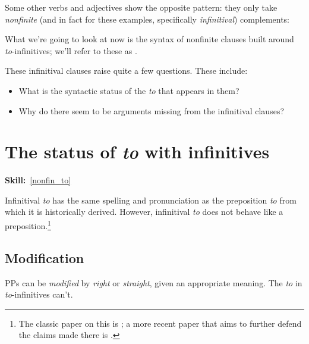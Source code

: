 \documentclass{article}
\begin{document}
Some other verbs and adjectives show the opposite pattern: they only take \textit{nonfinite} (and in fact for these examples, specifically \emph{infinitival}) complements:
\begin{exe}
\end{exe}

What we're going to look at now is the syntax of nonfinite clauses built around \emph{to}-infinitives; we'll refer to these as .

These infinitival clauses raise quite a few questions.
These include:
\begin{itemize}
    \item What is the syntactic status of the \emph{to} that appears in them? 
    \item Why do there seem to be arguments missing from the infinitival clauses?
\end{itemize}

\section{The status of \emph{to} with infinitives}
\hfill{}\textbf{Skill:}~\ref{nonfin_to}

Infinitival \emph{to} has the same spelling and pronunciation as the preposition \emph{to} from which it is historically derived.
However, infinitival \emph{to} does not behave like a preposition.\footnote{The classic paper on this is \citet{pullum_syncategorematicity_1982}; a more recent paper that aims to further defend the claims made there is \citet{levine_auxiliaries_2012}.}

\subsection{Modification}
PPs can be \emph{modified} by \emph{right} or \emph{straight}, given an appropriate meaning.
The \emph{to} in \emph{to}-infinitives can't.
\begin{exe}
\end{exe}
\end{document}
